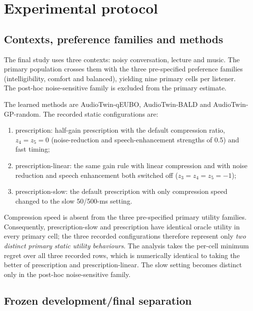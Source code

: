 \documentclass[preprint,12pt]{elsarticle}
\begin{document}
\section{Experimental protocol}
\label{sec:protocol}

\subsection{Contexts, preference families and methods}

The final study uses three contexts: noisy conversation, lecture and music. The primary population crosses them with the three pre-specified preference families (intelligibility, comfort and balanced), yielding nine primary cells per listener. The post-hoc noise-sensitive family is excluded from the primary estimate.

The learned methods are AudioTwin-qEUBO, AudioTwin-BALD and AudioTwin-GP-random. The recorded static configurations are:
\begin{enumerate}
    \item prescription: half-gain prescription with the default compression ratio, $z_4=z_5=0$ (noise-reduction and speech-enhancement strengths of 0.5) and fast timing;
    \item prescription-linear: the same gain rule with linear compression and with noise reduction and speech enhancement both switched off ($z_3=z_4=z_5=-1$);
    \item prescription-slow: the default prescription with only compression speed changed to the slow 50/500-ms setting.
\end{enumerate}

Compression speed is absent from the three pre-specified primary utility families. Consequently, prescription-slow and prescription have identical oracle utility in every primary cell; the three recorded configurations therefore represent only \emph{two distinct primary static utility behaviours}. The analysis takes the per-cell minimum regret over all three recorded rows, which is numerically identical to taking the better of prescription and prescription-linear. The slow setting becomes distinct only in the post-hoc noise-sensitive family.

\subsection{Frozen development/final separation}
\end{document}
